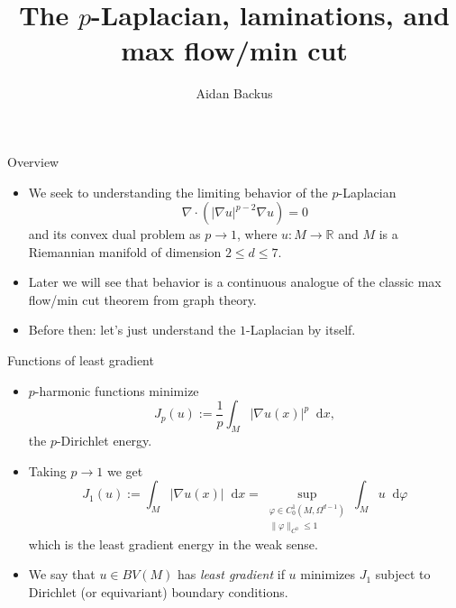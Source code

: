 \documentclass[10pt]{beamer}
\title[$p$-Laplacian and max flow/min cut]{The $p$-Laplacian, laminations, and max flow/min cut}
\author{Aidan Backus}
\newcommand{\RR}{\mathbb{R}}
\newcommand*\dif{\mathop{}\!\mathrm{d}}
\begin{document}
\begin{frame}
    \titlepage
\end{frame}

\begin{frame}{Overview}
\begin{itemize}
\item We seek to understanding the limiting behavior of the $p$-Laplacian 
$$\nabla \cdot (|\nabla u|^{p - 2} \nabla u) = 0$$
and its convex dual problem as $p \to 1$, where $u: M \to \RR$ and $M$ is a Riemannian manifold of dimension $2 \leq d \leq 7$. \pause
\item Later we will see that behavior is a continuous analogue of the classic max flow/min cut theorem from graph theory. \pause
\item Before then: let's just understand the $1$-Laplacian by itself. 
\end{itemize}
\end{frame}

\begin{frame}{Functions of least gradient}
\begin{itemize}
\item $p$-harmonic functions minimize
$$J_p(u) := \frac{1}{p} \int_M |\nabla u(x)|^p \dif x,$$
the $p$-Dirichlet energy. \pause
\item Taking $p \to 1$ we get
$$J_1(u) := \int_M |\nabla u(x)| \dif x = \sup_{\substack{\varphi \in C^1_0(M, \Omega^{d - 1}) \\ \|\varphi\|_{C^0} \leq 1}} \int_M u \dif \varphi$$
which is the least gradient energy in the weak sense. \pause
\item We say that $u \in BV(M)$ has \emph{least gradient} if $u$ minimizes $J_1$ subject to Dirichlet (or equivariant) boundary conditions.
\end{itemize}
\end{frame}
\end{document}
